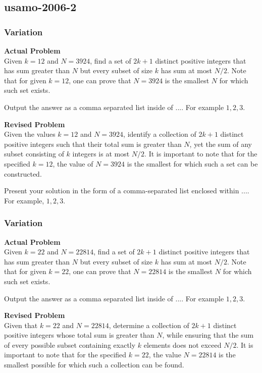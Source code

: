 \subsection{usamo-2006-2}
\subsubsection{Variation}
\textbf{Actual Problem}\\
Given $k = 12$ and $N = 3924$, find a set of $2k+1$ distinct positive integers that has sum greater than $N$ but every subset of size $k$ has sum at most $N/2$.
Note that for given $k = 12$, one can prove that $N = 3924$ is the smallest $N$ for which such set exists.

Output the answer as a comma separated list inside of $\boxed{...}$. For example $\boxed{1, 2, 3}$.

\textbf{Revised Problem}\\
Given the values \( k = 12 \) and \( N = 3924 \), identify a collection of \( 2k+1 \) distinct positive integers such that their total sum is greater than \( N \), yet the sum of any subset consisting of \( k \) integers is at most \( N/2 \).
It is important to note that for the specified \( k = 12 \), the value of \( N = 3924 \) is the smallest for which such a set can be constructed.

Present your solution in the form of a comma-separated list enclosed within $\boxed{...}$. For example, $\boxed{1, 2, 3}$.

\subsubsection{Variation}
\textbf{Actual Problem}\\
Given $k = 22$ and $N = 22814$, find a set of $2k+1$ distinct positive integers that has sum greater than $N$ but every subset of size $k$ has sum at most $N/2$.
Note that for given $k = 22$, one can prove that $N = 22814$ is the smallest $N$ for which such set exists.

Output the answer as a comma separated list inside of $\boxed{...}$. For example $\boxed{1, 2, 3}$.

\textbf{Revised Problem}\\
Given that \( k = 22 \) and \( N = 22814 \), determine a collection of \( 2k+1 \) distinct positive integers whose total sum is greater than \( N \), while ensuring that the sum of every possible subset containing exactly \( k \) elements does not exceed \( N/2 \). It is important to note that for the specified \( k = 22 \), the value \( N = 22814 \) is the smallest possible for which such a collection can be found.

